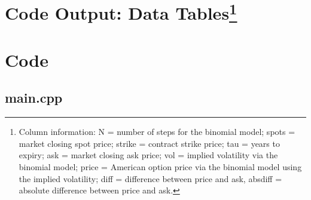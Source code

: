 \documentclass[12pt]{article}
\makeatletter
\let\oldappendix\appendix %
\renewcommand\appendix{%
    \oldappendix
    \newcommand{\section@cntformat}{\appendixname~\thesection\quad}
}
\makeatother
\begin{document}
\newpage
\appendix
\section{Code Output: Data Tables\protect\footnote{Column information: N = number of steps for the binomial model; spots = market closing spot price; strike = contract strike price; tau = years to expiry; ask = market closing ask price; vol = implied volatility via the binomial model; price = American option price via the binomial model using the implied volatility; diff = difference between price and ask, absdiff = absolute difference between price and ask.}}\label{sec:data}
{\small
{}
}
{\small
{}
}
{\small
{}
}

\newpage
\section{Code}\label{sec:code}
\subsection{main.cpp}

\end{document}
